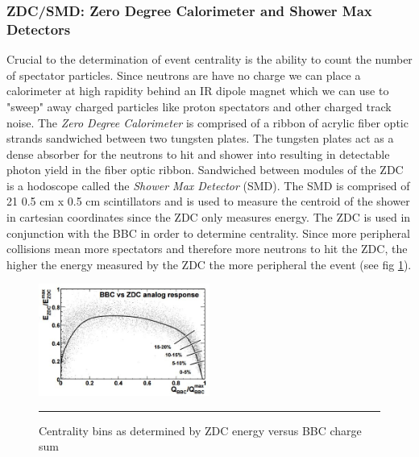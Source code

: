 \subsubsection{ZDC/SMD: Zero Degree Calorimeter and Shower Max Detectors}
Crucial to the determination of event centrality is the ability to count the number of spectator particles. Since neutrons are have no charge we can place a calorimeter at high rapidity behind an IR dipole magnet which we can use to "sweep" away charged particles like proton spectators and other charged track noise. The \textit{Zero Degree Calorimeter}\citep{ZDCfocus} is comprised of a ribbon of acrylic fiber optic strands sandwiched between two tungsten plates. The tungsten plates act as a dense absorber for the neutrons to hit and shower into resulting in detectable photon yield in the fiber optic ribbon. Sandwiched between modules of the ZDC is a hodoscope called the \textit{Shower Max Detector} (SMD). The SMD is comprised of 21 0.5 cm x 0.5 cm scintillators and is used to measure the centroid of the shower in cartesian coordinates since the ZDC only measures energy\citep{phenixzdc}. The ZDC is used in conjunction with the BBC in order to determine centrality. Since more peripheral collisions mean more spectators and therefore more neutrons to hit the ZDC, the higher the energy measured by the ZDC the more peripheral the event (see fig \ref{fig:zdcvsbbc}\citep{Ghosh2001}).

\begin{figure}[h!]
  \centering
    \includegraphics[width=0.5\textwidth]{prevplots/bbczdcanaresponse.JPG}
    \rule{35em}{0.5pt}
  \caption[Centrality bins as determined by ZDC energy versus BBC charge sum]{Centrality bins as determined by ZDC energy versus BBC charge sum\citep{Ghosh2001}}
  \label{fig:zdcvsbbc}
\end{figure}


